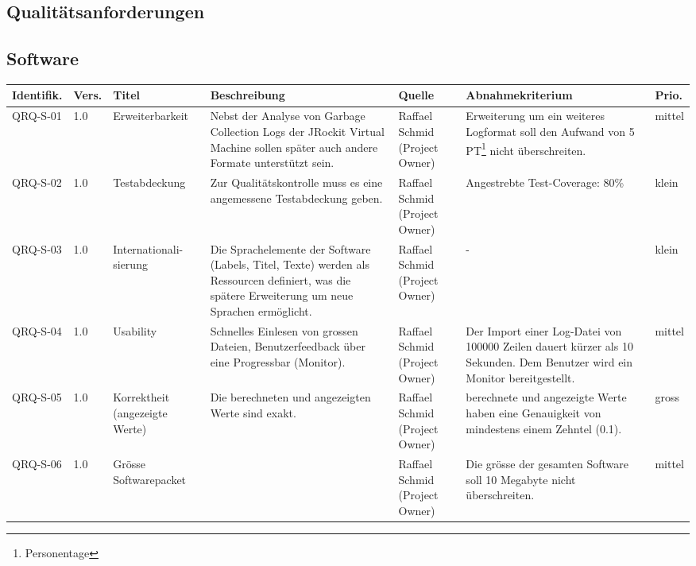 \begin{landscape}
\section{Qualitätsanforderungen}
\subsection{Software}
\begin{longtable}{|p{1.6cm}|p{0.7cm}|p{2.5cm}|p{4.5cm}|p{2.6cm}|p{4cm}|p{0.9cm}|}
    \hline
    \textbf{Identifik.} & \textbf{Vers.}& \textbf{Titel} & \textbf{Beschreibung} & \textbf{Quelle} & \textbf{Abnahmekriterium} & \textbf{Prio.}\\\hline
   QRQ-S-01 & 1.0 & Erweiterbarkeit & Nebst der Analyse von Garbage Collection Logs der JRockit Virtual Machine sollen später auch andere Formate unterstützt sein. & Raffael Schmid (Project Owner) & Erweiterung um ein weiteres Logformat soll den Aufwand von 5 PT\footnote{Personentage} nicht überschreiten. & mittel \\\hline
   QRQ-S-02 & 1.0 & Testabdeckung & Zur Qualitätskontrolle muss es eine angemessene Testabdeckung geben. & Raffael Schmid (Project Owner) & Angestrebte Test-Coverage: 80\% & klein \\\hline

  QRQ-S-03 & 1.0 & Internationali-sierung & Die Sprachelemente der Software (Labels, Titel, Texte) werden als Ressourcen definiert, was die spätere Erweiterung um neue Sprachen ermöglicht. & Raffael Schmid (Project Owner) & - & klein\\\hline

   QRQ-S-04 & 1.0 & Usability & Schnelles Einlesen von grossen Dateien, Benutzerfeedback über eine Progressbar (Monitor). & Raffael Schmid (Project Owner) & Der Import einer Log-Datei von 100000 Zeilen dauert kürzer als 10 Sekunden. Dem Benutzer wird ein Monitor bereitgestellt.&mittel \\\hline

  QRQ-S-05 & 1.0 & Korrektheit (angezeigte Werte) & Die berechneten und angezeigten Werte sind exakt. & Raffael Schmid (Project Owner) & berechnete und angezeigte Werte haben eine Genauigkeit von mindestens einem Zehntel (0.1). & gross\\\hline
  
QRQ-S-06 & 1.0 & Grösse Softwarepacket & & Raffael Schmid (Project Owner) & Die grösse der gesamten Software soll 10 Megabyte nicht überschreiten. & mittel\\\hline


\end{longtable}
\end{landscape}
